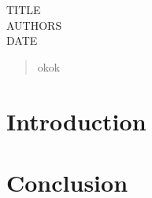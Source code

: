 \documentclass[11pt,a4paper]{article}
\begin{document}
TITLE\\
AUTHORS\\
DATE

\cleardoublepage{}
\begin{abstract}
  okok
\end{abstract}
\cleardoublepage{}
\section{Introduction}


\section{Conclusion}
\end{document}
